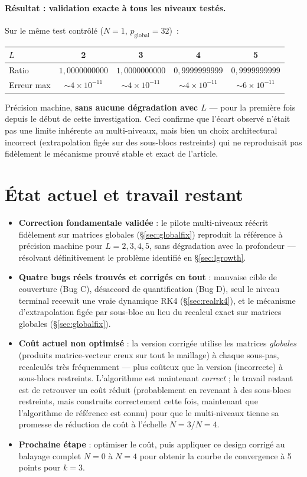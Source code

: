 \documentclass[11pt]{article}
\begin{document}
\paragraph{Résultat : validation exacte à tous les niveaux testés.}
Sur le même test contrôlé ($N=1$, $p_{\text{global}}=32$)~:
\begin{center}
\begin{tabular}{@{}lcccc@{}}
\toprule
$L$ & 2 & 3 & 4 & 5 \\
\midrule
Ratio & $1{,}0000000000$ & $1{,}0000000000$ & $0{,}9999999999$ & $0{,}9999999999$ \\
Erreur max & $\sim 4\times10^{-11}$ & $\sim 4\times10^{-11}$ & $\sim 4\times10^{-11}$ & $\sim 6\times10^{-11}$ \\
\bottomrule
\end{tabular}
\end{center}
Précision machine, \textbf{sans aucune dégradation avec $L$} --- pour la
première fois depuis le début de cette investigation. Ceci confirme que
l'écart observé n'était pas une limite inhérente au multi-niveaux, mais
bien un choix architectural incorrect (extrapolation figée sur des
sous-blocs restreints) qui ne reproduisait pas fidèlement le mécanisme
prouvé stable et exact de l'article.

\section{État actuel et travail restant}

\begin{itemize}
  \item \textbf{Correction fondamentale validée} : le pilote
  multi-niveaux réécrit fidèlement sur matrices globales
  (\S\ref{sec:globalfix}) reproduit la référence à précision machine
  pour $L=2,3,4,5$, sans dégradation avec la profondeur --- résolvant
  définitivement le problème identifié en \S\ref{sec:lgrowth}.
  \item \textbf{Quatre bugs réels trouvés et corrigés en tout} : mauvaise
  cible de couverture (Bug C), désaccord de quantification (Bug D),
  seul le niveau terminal recevait une vraie dynamique RK4
  (\S\ref{sec:realrk4}), et le mécanisme d'extrapolation figée par
  sous-bloc au lieu du recalcul exact sur matrices globales
  (\S\ref{sec:globalfix}).
  \item \textbf{Coût actuel non optimisé} : la version corrigée
  utilise les matrices \emph{globales} (produits matrice-vecteur creux
  sur tout le maillage) à chaque sous-pas, recalculés très fréquemment
  --- plus coûteux que la version (incorrecte) à sous-blocs restreints.
  L'algorithme est maintenant \emph{correct} ; le travail restant est de
  retrouver un coût réduit (probablement en revenant à des sous-blocs
  restreints, mais construits correctement cette fois, maintenant que
  l'algorithme de référence est connu) pour que le multi-niveaux tienne
  sa promesse de réduction de coût à l'échelle $N=3$/$N=4$.
  \item \textbf{Prochaine étape} : optimiser le coût, puis appliquer ce
  design corrigé au balayage complet $N=0$ à $N=4$ pour obtenir la
  courbe de convergence à 5 points pour $k=3$.
\end{itemize}
\end{document}
